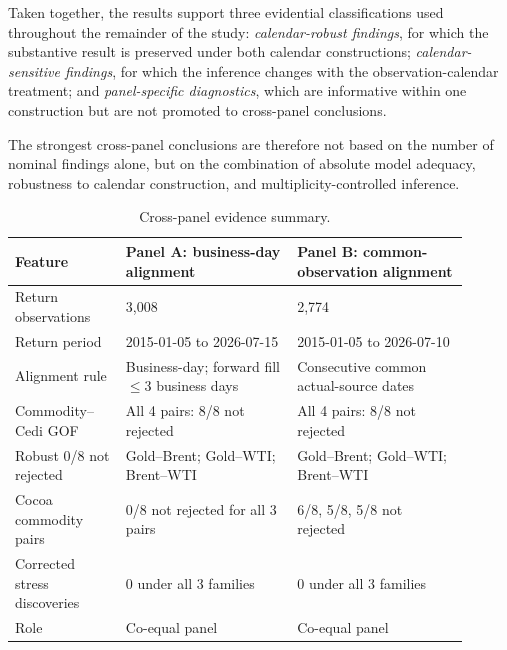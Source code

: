 Taken together, the results support three evidential classifications used throughout the remainder of the study: \emph{calendar-robust findings}, for which the substantive result is preserved under both calendar constructions; \emph{calendar-sensitive findings}, for which the inference changes with the observation-calendar treatment; and \emph{panel-specific diagnostics}, which are informative within one construction but are not promoted to cross-panel conclusions.

The strongest cross-panel conclusions are therefore not based on the number of nominal findings alone, but on the combination of absolute model adequacy, robustness to calendar construction, and multiplicity-controlled inference.

\begin{table}[htbp]
\centering
\caption{Cross-panel evidence summary.}
\label{tab:crosspanel}
\small
\begin{tabular}{p{0.22\linewidth}p{0.34\linewidth}p{0.34\linewidth}}
\toprule
Feature & Panel A: business-day alignment & Panel B: common-observation alignment \\
\midrule
Return observations & 3,008 & 2,774 \\
Return period & 2015-01-05 to 2026-07-15 & 2015-01-05 to 2026-07-10 \\
Alignment rule & Business-day; forward fill $\leq 3$ business days & Consecutive common actual-source dates \\
Commodity--Cedi GOF & All 4 pairs: 8/8 not rejected & All 4 pairs: 8/8 not rejected \\
Robust 0/8 not rejected & Gold--Brent; Gold--WTI; Brent--WTI & Gold--Brent; Gold--WTI; Brent--WTI \\
Cocoa commodity pairs & 0/8 not rejected for all 3 pairs & 6/8, 5/8, 5/8 not rejected \\
Corrected stress discoveries & 0 under all 3 families & 0 under all 3 families \\
Role & Co-equal panel & Co-equal panel \\
\bottomrule
\end{tabular}
\end{table}
